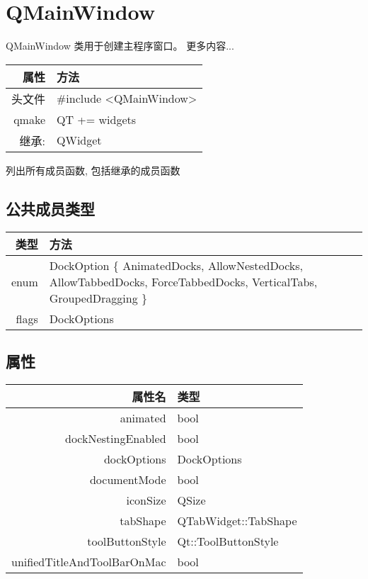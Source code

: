 \chapter{QMainWindow}

QMainWindow 类用于创建主程序窗口。 更多内容...


\begin{tabular}{|r|l|}
	\hline
	属性 & 方法 \\
	\hline
	头文件 & \#include <QMainWindow>\\      
	\hline
	qmake & QT += widgets\\      
	\hline
	继承: &	QWidget\\
	\hline
\end{tabular}

\begin{compactitem}[\arr]
\item 列出所有成员函数, 包括继承的成员函数
\end{compactitem}

\section{公共成员类型}

\begin{tabular}{|r|m{25em}|}
	\hline
	类型 & 方法 \\
	\hline
    enum &	DockOption \{ AnimatedDocks, AllowNestedDocks, AllowTabbedDocks, ForceTabbedDocks, VerticalTabs, GroupedDragging \} \\ 
    \hline
    flags &	DockOptions \\ 
	\hline
\end{tabular}

\section{属性}

\begin{tabular}{|r|l|}
	\hline
    属性名 &	类型 \\ 
    \hline
    animated 	& bool \\ 
    \hline
    dockNestingEnabled &	bool\\
    \hline
    dockOptions &	DockOptions\\
    \hline
    documentMode 	&bool\\
    \hline
    iconSize  &	QSize\\
    \hline
    tabShape 	&QTabWidget::TabShape\\
    \hline
    toolButtonStyle &	Qt::ToolButtonStyle\\
    \hline
    unifiedTitleAndToolBarOnMac &	bool\\
	\hline
\end{tabular}

